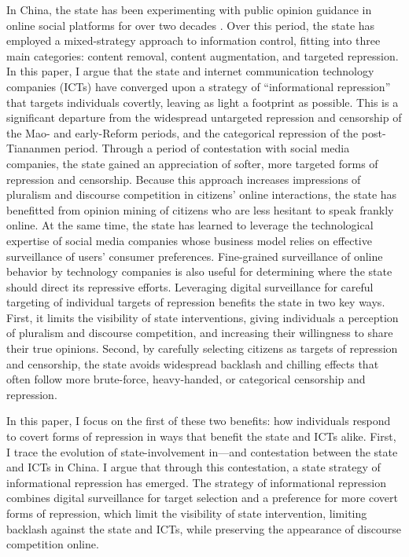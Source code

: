 \documentclass[11pt]{article}
\begin{document}
In China, the state has been experimenting with public opinion guidance in online social platforms for over two decades \citep{wei2015gongan,zou2015wangluo,xie2011zhongguo,xie2018zhongguo}. Over this period, the state has employed a mixed-strategy approach to information control, fitting into three main categories: content removal, content augmentation, and targeted repression. In this paper, I argue that the state and internet communication technology companies (ICTs) have converged upon a strategy of “informational repression” that targets individuals covertly, leaving as light a footprint as possible. This is a significant departure from the widespread untargeted repression and censorship of the Mao- and early-Reform periods, and the categorical repression of the post-Tiananmen period. Through a period of contestation with social media companies, the state gained an appreciation of softer, more targeted forms of repression and censorship. Because this approach increases impressions of pluralism and discourse competition in citizens’ online interactions, the state has benefitted from opinion mining of citizens who are less hesitant to speak frankly online. At the same time, the state has learned to leverage the technological expertise of social media companies whose business model relies on effective surveillance of users’ consumer preferences. Fine-grained surveillance of online behavior by technology companies is also useful for determining where the state should direct its repressive efforts. Leveraging digital surveillance for careful targeting of individual targets of repression benefits the state in two key ways. First, it limits the visibility of state interventions, giving individuals a perception of pluralism and discourse competition, and increasing their willingness to share their true opinions. Second, by carefully selecting citizens as targets of repression and censorship, the state avoids widespread backlash and chilling effects that often follow more brute-force, heavy-handed, or categorical censorship and repression.

In this paper, I focus on the first of these two benefits: how individuals respond to covert forms of repression in ways that benefit the state and ICTs alike. First, I trace the evolution of state-involvement in—and contestation between the state and ICTs in China. I argue that through this contestation, a state strategy of informational repression has emerged. The strategy of informational repression combines digital surveillance for target selection and a preference for more covert forms of repression, which limit the visibility of state intervention, limiting backlash against the state and ICTs, while preserving the appearance of discourse competition online.
\citep{han2015manufacturing,han2015defending,king2016chinese,miller2015automated}
\end{document}
